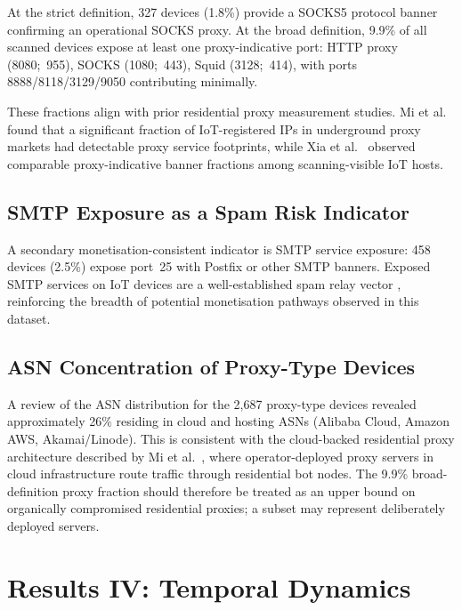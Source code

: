 \documentclass[journal]{IEEEtran}
\begin{document}
At the strict definition, 327 devices (1.8\%) provide a SOCKS5 protocol
banner confirming an operational SOCKS proxy.
At the broad definition, 9.9\% of all scanned devices expose at least one
proxy-indicative port: HTTP proxy (8080;~955), SOCKS (1080;~443),
Squid (3128;~414), with ports 8888/8118/3129/9050 contributing minimally.

These fractions align with prior residential proxy measurement studies.
Mi et al.~\cite{mi2019resident} found that a significant fraction of
IoT-registered IPs in underground proxy markets had detectable proxy
service footprints, while Xia et al.~\cite{xia2021characterizing}
observed comparable proxy-indicative banner fractions among scanning-visible
IoT hosts.

\subsection{SMTP Exposure as a Spam Risk Indicator}

A secondary monetisation-consistent indicator is SMTP service exposure:
458 devices (2.5\%) expose port~25 with Postfix or other SMTP banners.
Exposed SMTP services on IoT devices are a well-established spam relay
vector \cite{cozzi2018linux}, reinforcing the breadth of potential
monetisation pathways observed in this dataset.

\subsection{ASN Concentration of Proxy-Type Devices}

A review of the ASN distribution for the 2{,}687 proxy-type devices
revealed approximately 26\% residing in cloud and hosting ASNs
(Alibaba Cloud, Amazon AWS, Akamai/Linode).
This is consistent with the cloud-backed residential proxy architecture
described by Mi et al.~\cite{mi2019resident}, where operator-deployed
proxy servers in cloud infrastructure route traffic through residential
bot nodes.
The 9.9\% broad-definition proxy fraction should therefore be treated as an
upper bound on organically compromised residential proxies; a subset may
represent deliberately deployed servers.


\section{Results IV: Temporal Dynamics}
\label{sec:results4}
\end{document}
